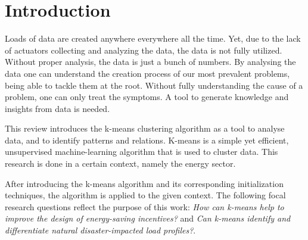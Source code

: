 \chapter{Introduction}
\label{cha:introduction}


Loads of data are created anywhere everywhere all the time.
Yet, due to the lack of actuators collecting and analyzing the data, the data is not fully utilized.
Without proper analysis, the data is just a bunch of numbers.
By analysing the data one can understand the creation process of our most prevalent problems, being able to tackle them at the root.
Without fully understanding the cause of a problem, one can only treat the symptoms.
A tool to generate knowledge and insights from data is needed.

This review introduces the k-means clustering algorithm as a tool to analyse data, and to identify patterns and relations.
K-means is a simple yet efficient, unsupervised machine-learning algorithm that is used to cluster data.
This research is done in a certain context, namely the energy sector.

After introducing the k-means algorithm and its corresponding initialization techniques, the algorithm is applied to the given context.
The following focal research questions reflect the purpose of this work:
\textit{How can k-means help to improve the design of energy-saving incentives?} and \textit{Can k-means identify and differentiate natural disaster-impacted load profiles?}.

